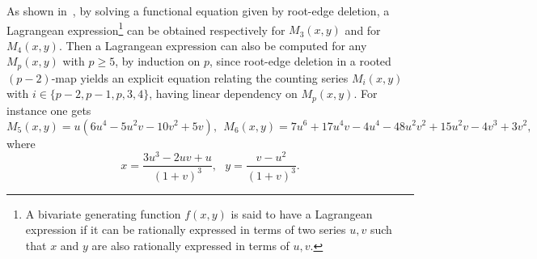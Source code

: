 \documentclass[letter]{amsart}
\numberwithin{theo}{section}
\theoremstyle{remark}
\begin{document}
As shown in~\cite{gao2001}, by solving a functional equation given by root-edge deletion, a Lagrangean expression\footnote{A bivariate generating function $f(x,y)$ is said to have a Lagrangean expression if it can be rationally expressed in terms of two series $u,v$ such that $x$ and $y$ are also rationally expressed in terms of $u,v$.} can be obtained respectively for $M_3(x,y)$ and for $M_4(x,y)$. Then a Lagrangean expression can also be computed for any $M_p(x,y)$ with $p\geq 5$, by induction on $p$, since root-edge deletion in a rooted $(p-2)$-map yields an explicit equation relating the counting series $M_i(x,y)$ with $i\in\{p-2,p-1,p,3,4\}$, having linear dependency on $M_p(x,y)$. For instance one gets
\begin{equation}\label{eq:M56}
M_5(x,y)=u(6u^4\!-5u^2v-\!10v^2\!+5v),\ \ M_6(x,y)=7u^6\!+\!17u^4v-4u^4\!-48u^2v^2\!+\!15u^2v-4v^3\!+3v^2,
\end{equation}
where 
\[
x=\frac{3u^3-2uv+u}{(1+v)^3},\ \ \ y=\frac{v-u^2}{(1+v)^3}.
\]
\end{document}
